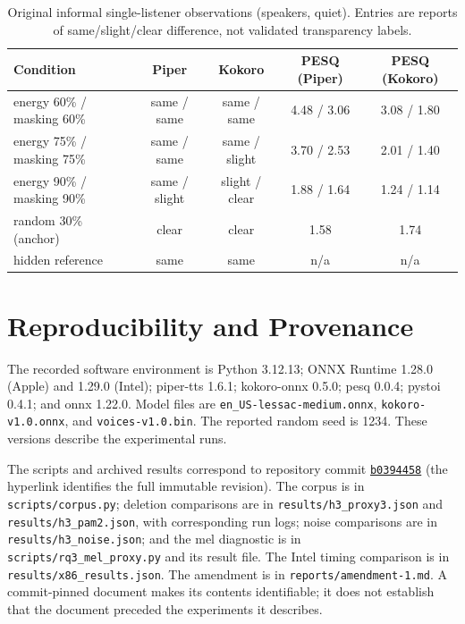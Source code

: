 \documentclass[11pt,a4paper]{article}
\newcommand{\releaseurl}{https://github.com/Deployment-inc/deep-perceptual-compute-allocation/tree/b0394458e38446b9b16cf60ca0153d0998827c0d}
\begin{document}
\begin{table}[htbp]
\centering
\caption{Original informal single-listener observations (speakers, quiet). Entries are reports of same/slight/clear difference, not validated transparency labels.}
\label{tab:pilot}
\small\setlength{\tabcolsep}{3.5pt}
\begin{tabular}{@{}lcccc@{}}
\toprule
\textbf{Condition} & \textbf{Piper} & \textbf{Kokoro} & \textbf{PESQ (Piper)} & \textbf{PESQ (Kokoro)} \\
\midrule
energy 60\% / masking 60\% & same / same & same / same & 4.48 / 3.06 & 3.08 / 1.80 \\
energy 75\% / masking 75\% & same / same & same / slight & 3.70 / 2.53 & 2.01 / 1.40 \\
energy 90\% / masking 90\% & same / slight & slight / clear & 1.88 / 1.64 & 1.24 / 1.14 \\
random 30\% (anchor) & clear & clear & 1.58 & 1.74 \\
hidden reference & same & same & n/a & n/a \\
\bottomrule
\end{tabular}
\end{table}


\section{Reproducibility and Provenance}
\label{app:provenance}
The recorded software environment is Python 3.12.13; ONNX Runtime 1.28.0 (Apple) and 1.29.0 (Intel); piper-tts 1.6.1; kokoro-onnx 0.5.0; pesq 0.0.4; pystoi 0.4.1; and onnx 1.22.0. Model files are \texttt{en\_US-lessac-medium.onnx}, \texttt{kokoro-v1.0.onnx}, and \texttt{voices-v1.0.bin}. The reported random seed is 1234. These versions describe the experimental runs.

The scripts and archived results correspond to repository commit \href{\releaseurl}{\texttt{b0394458}} (the hyperlink identifies the full immutable revision). The corpus is in \texttt{scripts/corpus.py}; deletion comparisons are in \texttt{results/h3\_proxy3.json} and \texttt{results/h3\_pam2.json}, with corresponding run logs; noise comparisons are in \texttt{results/h3\_noise.json}; and the mel diagnostic is in \texttt{scripts/rq3\_mel\_proxy.py} and its result file. The Intel timing comparison is in \texttt{results/x86\_results.json}. The amendment is in \texttt{reports/amendment-1.md}. A commit-pinned document makes its contents identifiable; it does not establish that the document preceded the experiments it describes.
\end{document}
